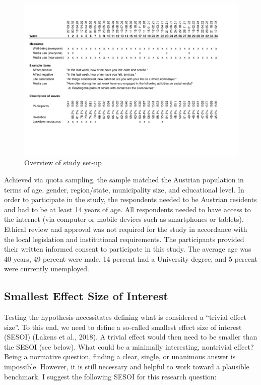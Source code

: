 \documentclass[
  man,mask,floatsintext]{apa7}
\begin{document}
\begin{figure}
\includegraphics[width=1\textwidth]{figures/fig_study_description} \caption{Overview of study set-up}\label{fig:study-desc}
\end{figure}

Achieved via quota sampling, the sample matched the Austrian population in terms of age, gender, region/state, municipality size, and educational level.
In order to participate in the study, the respondents needed to be Austrian residents and had to be at least 14 years of age.
All respondents needed to have access to the internet (via computer or mobile devices such as smartphones or tablets).
Ethical review and approval was not required for the study in accordance with the local legislation and institutional requirements.
The participants provided their written informed consent to participate in this study.
The average age was 40 years, 49 percent were male, 14 percent had a University degree, and 5 percent were currently unemployed.

\hypertarget{smallest-effect-size-of-interest}{%
\subsection{Smallest Effect Size of Interest}\label{smallest-effect-size-of-interest}}

Testing the hypothesis necessitates defining what is considered a ``trivial effect size''.
To this end, we need to define a so-called smallest effect size of interest (SESOI) (Lakens et al., 2018).
A trivial effect would then need to be smaller than the SESOI (see below).
What could be a minimally interesting, nontrivial effect?
Being a normative question, finding a clear, single, or unanimous answer is impossible.
However, it is still necessary and helpful to work toward a plausible benchmark.
I suggest the following SESOI for this research question:
\end{document}
